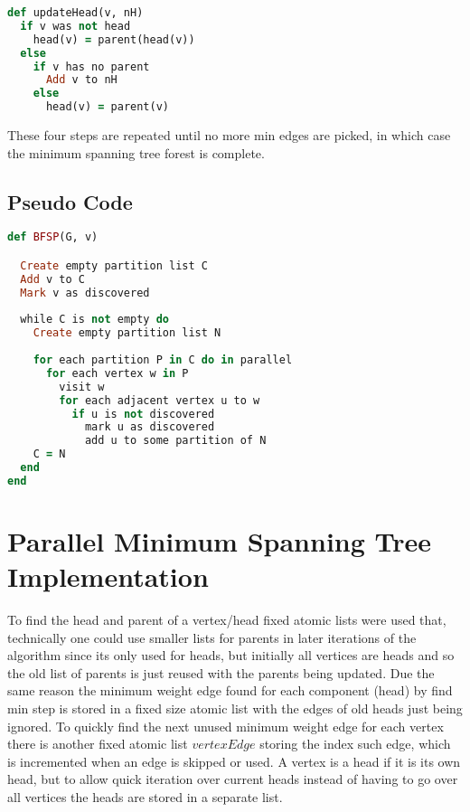 \documentclass{report}
\theoremstyle{plain}
\theoremstyle{definition}
\theoremstyle{remark}
\begin{document}
\begin{lstlisting}[language=Ruby]
def updateHead(v, nH)
  if v was not head
    head(v) = parent(head(v))
  else
    if v has no parent
      Add v to nH
    else
      head(v) = parent(v)
\end{lstlisting}

These four steps are repeated until no more min edges are picked, in which case the minimum spanning tree forest is complete.

\subsection*{Pseudo Code} 
\begin{lstlisting}[language=Ruby]
def BFSP(G, v)

  Create empty partition list C
  Add v to C
  Mark v as discovered
  
  while C is not empty do
    Create empty partition list N
  	
    for each partition P in C do in parallel
      for each vertex w in P
        visit w
        for each adjacent vertex u to w
          if u is not discovered  	      
            mark u as discovered
            add u to some partition of N
    C = N
  end
end
\end{lstlisting}

\section{Parallel Minimum Spanning Tree Implementation}

To find the head and parent of a vertex/head fixed atomic lists were used that, technically one could use smaller lists for parents in later iterations of the algorithm since its only used for heads, but initially all vertices are heads and so the old list of parents is just reused with the parents being updated. Due the same reason the minimum weight edge found for each component (head) by find min step is stored in a fixed size atomic list with the edges of old heads just being ignored. To quickly find the next unused minimum weight edge for each vertex there is another fixed atomic list $vertexEdge$ storing the index such edge, which is incremented when an edge is skipped or used. A vertex is a head if it is its own head, but to allow quick iteration over current heads instead of having to go over all vertices the heads are stored in a separate list.
\end{document}
